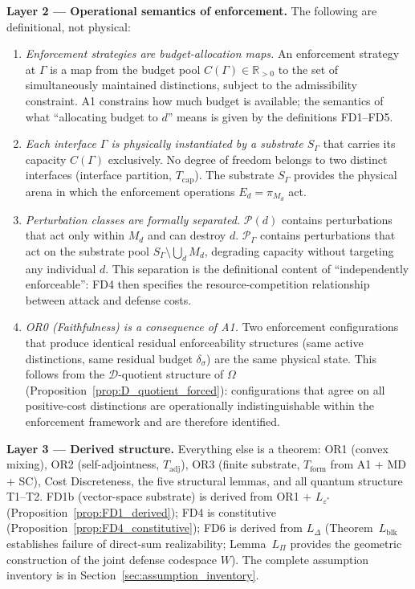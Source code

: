 \documentclass[11pt]{article}
\theoremstyle{remark}
\begin{document}
\medskip\noindent\textbf{Layer 2 --- Operational semantics of enforcement.}  The following are definitional, not physical:
\begin{enumerate}[nosep,leftmargin=2em,itemsep=3pt,label=(\roman*)]
  \item \textit{Enforcement strategies are budget-allocation maps.}  An enforcement strategy at $\Gamma$ is a map from the budget pool $C(\Gamma) \in \mathbb{R}_{>0}$ to the set of simultaneously maintained distinctions, subject to the admissibility constraint.  A1 constrains how much budget is available; the semantics of what ``allocating budget to $d$'' means is given by the definitions FD1--FD5.
  \item \textit{Each interface $\Gamma$ is physically instantiated by a substrate $S_\Gamma$} that carries its capacity $C(\Gamma)$ exclusively.  No degree of freedom belongs to two distinct interfaces (interface partition, $T_{\mathrm{cap}}$).  The substrate $S_\Gamma$ provides the physical arena in which the enforcement operations $E_d = \pi_{M_d}$ act.
  \item \textit{Perturbation classes are formally separated.}  $\mathcal{P}(d)$ contains perturbations that act only within $M_d$ and can destroy $d$.  $\mathcal{P}_\Gamma$ contains perturbations that act on the substrate pool $S_\Gamma \setminus \bigcup_d M_d$, degrading capacity without targeting any individual $d$.  This separation is the definitional content of ``independently enforceable'': FD4 then specifies the resource-competition relationship between attack and defense costs.
  \item \textit{OR0 (Faithfulness) is a consequence of A1.}  Two enforcement configurations that produce identical residual enforceability structures (same active distinctions, same residual budget $\delta_\sigma$) are the same physical state.  This follows from the $\mathcal{D}$-quotient structure of $\Omega$ (Proposition~\ref{prop:D_quotient_forced}): configurations that agree on all positive-cost distinctions are operationally indistinguishable within the enforcement framework and are therefore identified.
\end{enumerate}

\medskip\noindent\textbf{Layer 3 --- Derived structure.}  Everything else is a theorem: OR1 (convex mixing), OR2 (self-adjointness, $T_{\mathrm{adj}}$), OR3 (finite substrate, $T_{\mathrm{form}}$ from A1 + MD + SC), Cost Discreteness, the five structural lemmas, and all quantum structure T1--T2.  FD1b (vector-space substrate) is derived from OR1 + $L_{\varepsilon^*}$ (Proposition~\ref{prop:FD1_derived}); FD4 is constitutive (Proposition~\ref{prop:FD4_constitutive}); FD6 is derived from $L_\Delta$ (Theorem~$L_{\mathrm{blk}}$ establishes failure of direct-sum realizability; Lemma~$L_\Pi$ provides the geometric construction of the joint defense codespace $W$).  The complete assumption inventory is in Section~\ref{sec:assumption_inventory}.
\end{document}
